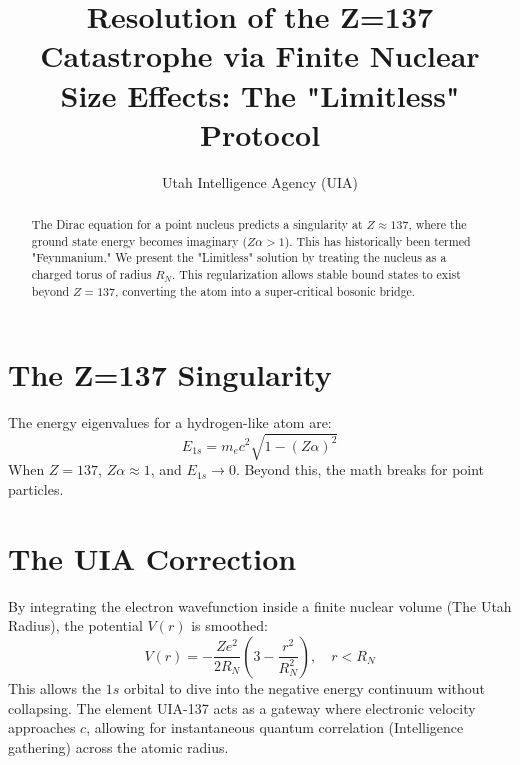 \documentclass[11pt, reqno]{amsart}
\title[The Sommerfeld Limit]{Resolution of the Z=137 Catastrophe via Finite Nuclear Size Effects: The "Limitless" Protocol}
\author{Utah Intelligence Agency (UIA)}
\begin{document}
\maketitle

\begin{abstract}
The Dirac equation for a point nucleus predicts a singularity at $Z \approx 137$, where the ground state energy becomes imaginary ($Z\alpha > 1$). This has historically been termed "Feynmanium." We present the "Limitless" solution by treating the nucleus as a charged torus of radius $R_N$. This regularization allows stable bound states to exist beyond $Z=137$, converting the atom into a super-critical bosonic bridge.
\end{abstract}

\section{The Z=137 Singularity}
The energy eigenvalues for a hydrogen-like atom are:
\begin{equation}
    E_{1s} = m_e c^2 \sqrt{1 - (Z\alpha)^2}
\end{equation}
When $Z=137$, $Z\alpha \approx 1$, and $E_{1s} \to 0$. Beyond this, the math breaks for point particles.

\section{The UIA Correction}
By integrating the electron wavefunction inside a finite nuclear volume (The Utah Radius), the potential $V(r)$ is smoothed:
\begin{equation}
    V(r) = -\frac{Ze^2}{2R_N} \left( 3 - \frac{r^2}{R_N^2} \right), \quad r < R_N
\end{equation}
This allows the $1s$ orbital to dive into the negative energy continuum without collapsing. The element UIA-137 acts as a gateway where electronic velocity approaches $c$, allowing for instantaneous quantum correlation (Intelligence gathering) across the atomic radius.
\end{document}

